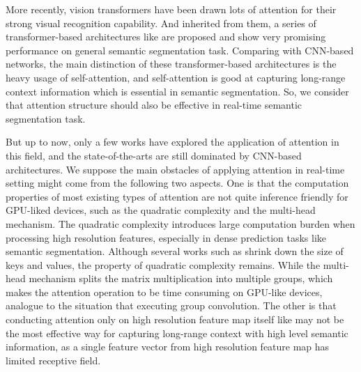\documentclass{article}
\begin{document}
More recently, vision transformers have been drawn lots of attention for their strong visual recognition capability\cite{vit, Deit, swin-v1, wang2021pyramid, wang2022pvt}. And inherited from them, a series of transformer-based architectures like\cite{zheng2021rethinking, xie2021segformer, yuan2021hrformer, ranftl2021vision} are proposed and show very promising performance on general semantic segmentation task. Comparing with CNN-based networks, the main distinction of these transformer-based architectures is the heavy usage of self-attention, and self-attention is good at capturing long-range context information which is essential in semantic segmentation. So, we consider that attention structure should also be effective in real-time semantic segmentation task. 

But up to now, only a few works\cite{xie2021segformer} have explored the application of attention in this field, and the state-of-the-arts are still dominated by CNN-based architectures. We suppose the main obstacles of applying attention in real-time setting might come from the following two aspects. One is that the computation properties of most existing types of attention are not quite inference friendly for GPU-liked devices, such as the quadratic complexity and the multi-head mechanism. The quadratic complexity introduces large computation burden when processing high resolution features, especially in dense prediction tasks like semantic segmentation. Although several works such as\cite{wang2021pyramid, xie2021segformer} shrink down the size of keys and values, the property of quadratic complexity remains. While the multi-head mechanism splits the matrix multiplication into multiple groups, which makes the attention operation to be time consuming on GPU-like devices, analogue to the situation that executing group convolution. The other is that conducting attention only on high resolution feature map itself like\cite{xie2021segformer, yuan2021hrformer} may not be the most effective way for capturing long-range context with high level semantic information, as a single feature vector from high resolution feature map has limited receptive field.
\end{document}
